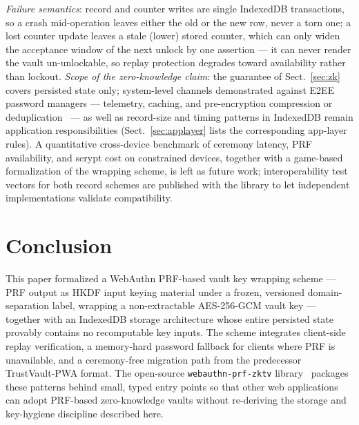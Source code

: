 \documentclass[runningheads]{llncs}
\begin{document}
\emph{Failure semantics}: record and counter writes are single IndexedDB transactions, so a crash mid-operation leaves either the old or the new row, never a torn one; a lost counter update leaves a stale (lower) stored counter, which can only widen the acceptance window of the next unlock by one assertion --- it can never render the vault un-unlockable, so replay protection degrades toward availability rather than lockout.
\emph{Scope of the zero-knowledge claim}: the guarantee of Sect.~\ref{sec:zk} covers persisted state only; system-level channels demonstrated against E2EE password managers --- telemetry, caching, and pre-encryption compression or deduplication~\cite{injection-attacks} --- as well as record-size and timing patterns in IndexedDB remain application responsibilities (Sect.~\ref{sec:applayer} lists the corresponding app-layer rules).
A quantitative cross-device benchmark of ceremony latency, PRF availability, and scrypt cost on constrained devices, together with a game-based formalization of the wrapping scheme, is left as future work; interoperability test vectors for both record schemes are published with the library to let independent implementations validate compatibility.

\section{Conclusion}
This paper formalized a WebAuthn PRF-based vault key wrapping scheme --- PRF output as HKDF input keying material under a frozen, versioned domain-separation label, wrapping a non-extractable AES-256-GCM vault key --- together with an IndexedDB storage architecture whose entire persisted state provably contains no recomputable key inputs.
The scheme integrates client-side replay verification, a memory-hard password fallback for clients where PRF is unavailable, and a ceremony-free migration path from the predecessor TrustVault-PWA format.
The open-source \texttt{webauthn-prf-zktv} library~\cite{zktv-lib} packages these patterns behind small, typed entry points so that other web applications can adopt PRF-based zero-knowledge vaults without re-deriving the storage and key-hygiene discipline described here.



\end{document}
